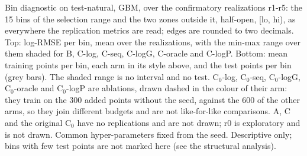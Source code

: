 Bin diagnostic on test-natural, GBM, over the confirmatory realizations r1-r5: the 15 bins of the selection range and the two zones outside it, half-open, [lo, hi), as everywhere the replication metrics are read; edges are rounded to two decimals. Top: log-RMSE per bin, mean over the realizations, with the min-max range over them shaded for B, C-log, C-seq, C-logG, C-oracle and C-logP. Bottom: mean training points per bin, each arm in its style above, and the test points per bin (grey bars). The shaded range is no interval and no test. C$_0$-log, C$_0$-seq, C$_0$-logG, C$_0$-oracle and C$_0$-logP are ablations, drawn dashed in the colour of their arm: they train on the 300 added points without the seed, against the 600 of the other arms, so they join different budgets and are not like-for-like comparisons. A, C and the original C$_0$ have no replications and are not drawn; r0 is exploratory and is not drawn. Common hyper-parameters fixed from the seed. Descriptive only; bins with few test points are not marked here (see the structural analysis).
